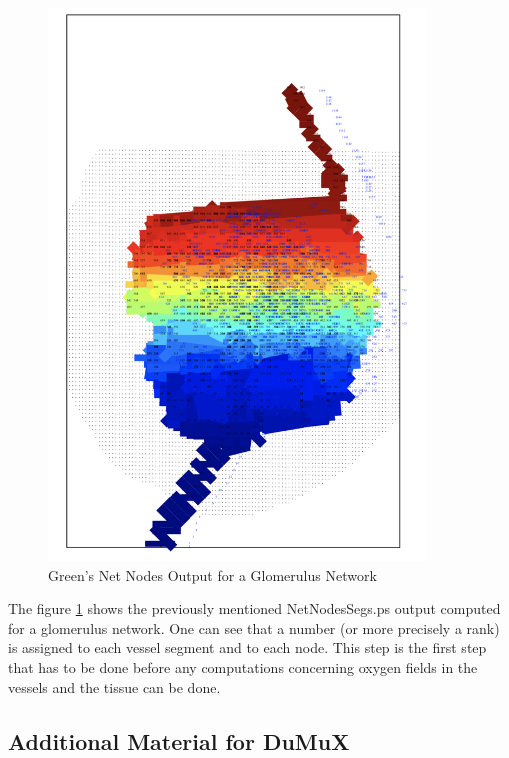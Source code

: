 \begin{figure}[h]
\centering
\includegraphics[width=100mm]{NetNodesSegs_Glom}
\caption{\footnotesize Green's Net Nodes Output for a Glomerulus Network}
\label{fig:NetNodesSegs_Glom}
\end{figure}
The figure \ref{fig:NetNodesSegs_Glom} shows the previously mentioned NetNodesSegs.ps output computed for a glomerulus network. One can see that a number (or more precisely a rank) is assigned to each vessel segment and to each node. This step is the first step that has to be done before any computations concerning oxygen fields in the vessels and the tissue can be done.

\subsection{Additional Material for DuMuX}


